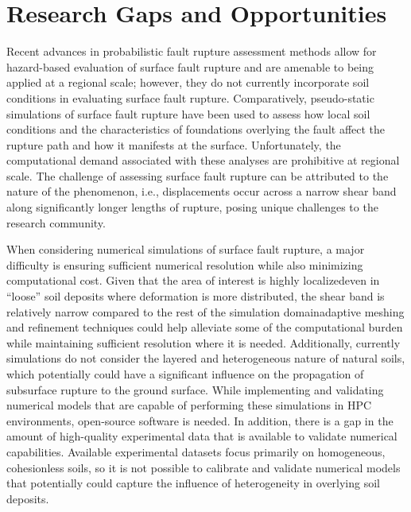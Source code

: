 \section{Research Gaps and Opportunities}
\label{sec:eq_surface_rup_research_gaps}
Recent advances in probabilistic fault rupture assessment methods allow for hazard-based evaluation of surface fault rupture and are amenable to being applied at a regional scale; however, they do not currently incorporate soil conditions in evaluating surface fault rupture. Comparatively, pseudo-static simulations of surface fault rupture have been used to assess how local soil conditions and the characteristics of foundations overlying the fault affect the rupture path and how it manifests at the surface. Unfortunately, the computational demand associated with these analyses are prohibitive at regional scale. The challenge of assessing surface fault rupture can be attributed to the nature of the phenomenon, i.e., displacements occur across a narrow shear band along significantly longer lengths of rupture, posing unique challenges to the research community.


When considering numerical simulations of surface fault rupture, a major difficulty is ensuring sufficient numerical resolution while also minimizing computational cost. Given that the area of interest is highly localized\textemdash even in ``loose'' soil deposits where deformation is more distributed, the shear band is relatively narrow compared to the rest of the simulation domain\textemdash adaptive meshing and refinement techniques could help alleviate some of the computational burden while maintaining sufficient resolution where it is needed. Additionally, currently simulations do not consider the layered and heterogeneous nature of natural soils, which potentially could have a significant influence on the propagation of subsurface rupture to the ground surface. While implementing and validating numerical models that are capable of performing these simulations in HPC environments, open-source software is needed. In addition, there is a gap in the amount of high-quality experimental data that is available to validate numerical capabilities. Available experimental datasets focus primarily on homogeneous, cohesionless soils, so it is not possible to calibrate and validate numerical models that potentially could capture the influence of heterogeneity in overlying soil deposits.


